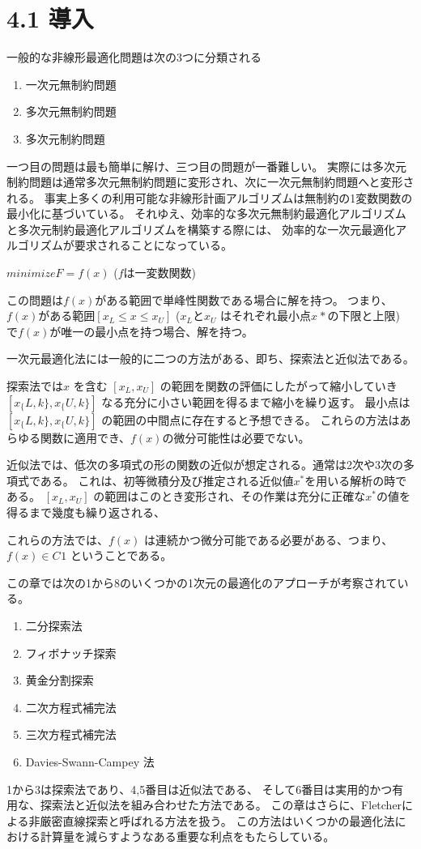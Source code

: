 \section{4.1 導入}\label{4-1-}

一般的な非線形最適化問題は次の3つに分類される

\begin{enumerate}
\tightlist
\item
  一次元無制約問題
\item
  多次元無制約問題
\item
  多次元制約問題
\end{enumerate}

一つ目の問題は最も簡単に解け、三つ目の問題が一番難しい。
実際には多次元制約問題は通常多次元無制約問題に変形され、次に一次元無制約問題へと変形される。
事実上多くの利用可能な非線形計画アルゴリズムは無制約の1変数関数の最小化に基づいている。
それゆえ、効率的な多次元無制約最適化アルゴリズムと多次元制約最適化アルゴリズムを構築する際には、
効率的な一次元最適化アルゴリズムが要求されることになっている。

$ minimize F = f(x) $ ($f$は一変数関数)

この問題は$f(x)$がある範囲で単峰性関数である場合に解を持つ。
つまり、$ f(x) $がある範囲$ [x_L \leq x
\leq x_U] $ ($ x_L $と$ x_U $
はそれぞれ最小点$ x^{}* $の下限と上限) で$ f(x)
$が唯一の最小点を持つ場合、解を持つ。

一次元最適化法には一般的に二つの方法がある、即ち、探索法と近似法である。

探索法では$ x $ を含む $ [x_L , x_U] $
の範囲を関数の評価にしたがって縮小していき $ [ x_\{L,k\} ,
x_\{U,k\} ] $ なる充分に小さい範囲を得るまで縮小を繰り返す。
最小点は $ [ x_\{L,k\} , x_\{U,k\} ] $
の範囲の中間点に存在すると予想できる。
これらの方法はあらゆる関数に適用でき、$ f(x)
$の微分可能性は必要でない。

近似法では、低次の多項式の形の関数の近似が想定される。通常は2次や3次の多項式である。
これは、初等微積分及び推定される近似値$ x^*
$を用いる解析の時である。 $[ x_L , x_U ] $
の範囲はこのとき変形され、その作業は充分に正確な$ x^*
$の値を得るまで幾度も繰り返される、

これらの方法では、$ f(x) $
は連続かつ微分可能である必要がある、つまり、 $ f(x) \in
C^{}1 $ ということである。

この章では次の1から8のいくつかの1次元の最適化のアプローチが考察されている。

\begin{enumerate}
\tightlist
\item
  二分探索法
\item
  フィボナッチ探索
\item
  黄金分割探索
\item
  二次方程式補完法
\item
  三次方程式補完法
\item
  Davies-Swann-Campey 法
\end{enumerate}

1から3は探索法であり、4,5番目は近似法である、
そして6番目は実用的かつ有用な、探索法と近似法を組み合わせた方法である。
この章はさらに、Fletcherによる非厳密直線探索と呼ばれる方法を扱う。
この方法はいくつかの最適化法における計算量を減らすようなある重要な利点をもたらしている。
